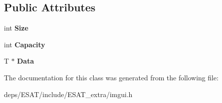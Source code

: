 \subsection*{Public Attributes}
\begin{DoxyCompactItemize}
\item 
\mbox{\label{class_im_vector_abbfd157947f66280d27b21d70a16df8d}} 
int {\bfseries Size}
\item 
\mbox{\label{class_im_vector_abd24482b4d30d22e37582e521e5bfb33}} 
int {\bfseries Capacity}
\item 
\mbox{\label{class_im_vector_ac0e46e8b30cb079d93c8f0aad7d7cbd0}} 
T $\ast$ {\bfseries Data}
\end{DoxyCompactItemize}


The documentation for this class was generated from the following file\+:\begin{DoxyCompactItemize}
\item 
deps/\+E\+S\+A\+T/include/\+E\+S\+A\+T\+\_\+extra/imgui.\+h\end{DoxyCompactItemize}
